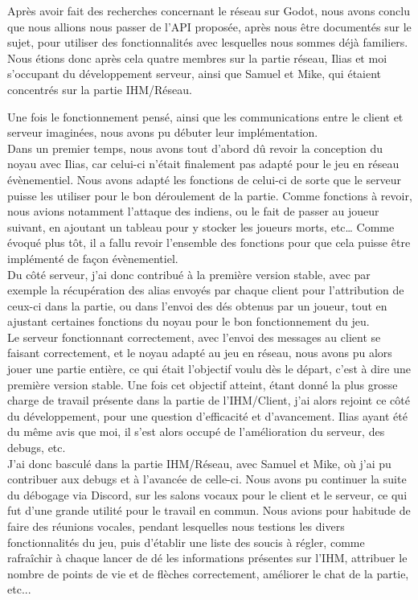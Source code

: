 \documentclass[a4paper,11pt]{article}
\begin{document}
Après avoir fait des recherches concernant le réseau sur Godot, nous avons conclu que nous allions nous passer de l’API proposée, après nous être documentés sur le sujet, pour utiliser des fonctionnalités avec lesquelles nous sommes déjà familiers. \\

Nous étions donc après cela quatre membres sur la partie réseau, Ilias et moi s’occupant du développement serveur, ainsi que Samuel et Mike, qui étaient concentrés sur la partie IHM/Réseau.

\newpage

Une fois le fonctionnement pensé, ainsi que les communications entre le client et serveur imaginées, nous avons pu débuter leur implémentation. \\

Dans un premier temps, nous avons tout d’abord dû revoir la conception du noyau avec Ilias, car celui-ci n’était finalement pas adapté pour le jeu en réseau évènementiel. Nous avons adapté les fonctions de celui-ci de sorte que le serveur puisse les utiliser pour le bon déroulement de la partie. Comme fonctions à revoir, nous avions notamment l’attaque des indiens, ou le fait de passer au joueur suivant, en ajoutant un tableau pour y stocker les joueurs morts, etc… Comme évoqué plus tôt, il a fallu revoir l’ensemble des fonctions pour que cela puisse être implémenté de façon évènementiel. \\

Du côté serveur, j’ai donc contribué à la première version stable, avec par exemple la récupération des alias envoyés par chaque client pour l’attribution de ceux-ci dans la partie, ou dans l’envoi des dés obtenus par un joueur, tout en ajustant certaines fonctions du noyau pour le bon fonctionnement du jeu. \\

Le serveur fonctionnant correctement, avec l’envoi des messages au client se faisant correctement, et le noyau adapté au jeu en réseau, nous avons pu alors jouer une partie entière, ce qui était l’objectif voulu dès le départ, c’est à dire une première version stable. Une fois cet objectif atteint, étant donné la plus grosse charge de travail présente dans la partie de l’IHM/Client, j’ai alors rejoint ce côté du développement, pour une question d’efficacité et d’avancement. Ilias ayant été du même avis que moi, il s’est alors occupé de l’amélioration du serveur, des debugs, etc. \\

J’ai donc basculé dans la partie IHM/Réseau, avec Samuel et Mike, où j’ai pu contribuer aux debugs et à l’avancée de celle-ci. Nous avons pu continuer la suite du débogage via Discord, sur les salons vocaux pour le client et le serveur, ce qui fut d’une grande utilité pour le travail en commun. Nous avions pour habitude de faire des réunions vocales, pendant lesquelles nous testions les divers fonctionnalités du jeu, puis d’établir une liste des soucis à régler, comme rafraîchir à chaque lancer de dé les informations présentes sur l’IHM, attribuer le nombre de points de vie et de flèches correctement, améliorer le chat de la partie, etc... \\
\end{document}
